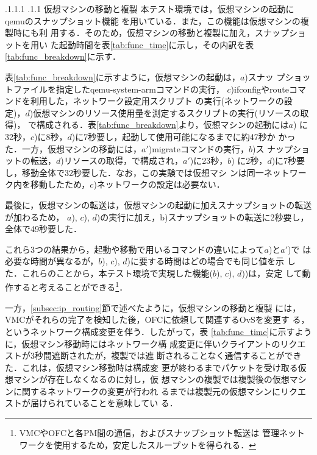 \documentclass[a4paper, twocolumn]{jarticle}
\makeatletter
\def\subsection{\@startsection{subsection}{1}{\z@}%
 {.1\Cvs \@plus.1\Cdp \@minus.1\Cdp}%
 {.1\Cvs \@plus.1\Cdp}%
 {\normalfont\normalsize\bfseries}}
\makeatother
\begin{document}
\subsection{仮想マシンの移動と複製}
\label{subsec:migrate_duplicate}
本テスト環境では，仮想マシンの起動にqemuのスナップショット機能
\cite{snapshot}を用いている．また，この機能は仮想マシンの複製時にも利
用する．そのため，仮想マシンの移動と複製に加え，スナップショットを用い
た起動時間を表\ref{tab:func_time}に示し，その内訳を表
\ref{tab:func_breakdown}に示す．

表\ref{tab:func_breakdown}に示すように，仮想マシンの起動は，$a$)スナッ
プショットファイルを指定したqemu-system-armコマンドの実行，
$c$)ifconfigやrouteコマンドを利用した，ネットワーク設定用スクリプト
の実行(ネットワークの設定)，$d$)仮想マシンのリソース使用量を測定するスクリプトの実行(リソースの取得)，
で構成される．表\ref{tab:func_breakdown}より，仮想マシンの起動には$a$)
に32秒，$c$)に8秒，$d$)に7秒要し，起動して使用可能になるまでに約47秒か
かった．一方，仮想マシンの移動には，$a'$)migrateコマンドの実行，$b$)ス
ナップショットの転送，$d$)リソースの取得，で構成され，$a'$)に23秒，$b$)
に2秒，$d$)に7秒要し，移動全体で32秒要した．なお，この実験では仮想マシ
ンは同一ネットワーク内を移動したため，$c$)ネットワークの設定は必要ない．

最後に，仮想マシンの転送は，仮想マシンの起動に加えスナップショットの転送が加わるため，
$a$), $c$), $d$)の実行に加え，b)スナップショットの転送に2秒要し，全体で49秒要した．

これら3つの結果から，起動や移動で用いるコマンドの違いによって$a$)と$a'$)で
は必要な時間が異なるが，$b$), $c$), $d$)に要する時間はどの場合でも同じ値を示
した．これらのことから，本テスト環境で実現した機能($b$), $c$), $d$))は，安定
して動作すると考えることができる\footnote{VMCやOFCと各PM間の通信，およびスナップショット転送は
管理ネットワークを使用するため，安定したスループットを得られる．}．

一方，\ref{subsec:ip_routing}節で述べたように，仮想マシンの移動と複製
には，VMCがそれらの完了を検知した後，OFCに依頼して関連するOvSを変更す
る，というネットワーク構成変更を伴う．したがって，表
\ref{tab:func_time}に示すように，仮想マシン移動時にはネットワーク構
成変更に伴いクライアントのリクエストが3秒間遮断されたが，複製では遮
断されることなく通信することができた．これは，仮想マシン移動時は構成変
更が終わるまでパケットを受け取る仮想マシンが存在しなくなるのに対し，仮
想マシンの複製では複製後の仮想マシンに関するネットワークの変更が行われ
るまでは複製元の仮想マシンにリクエストが届けられていることを意味してい
る．
\end{document}

